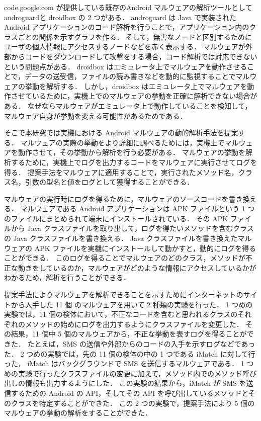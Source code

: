 code.google.com が提供している既存のAndroid マルウェアの解析ツールとして androguard\cite{aguard}と droidbox\cite{dbox} の 2 つがある．
androguard は Java で実装された Android アプリケーションのコード解析を行うことで，アプリケーション内のクラスごとの関係を示すグラフを作る．
そして，無害なノードと区別するためにユーザの個人情報にアクセスするノードなどを赤く表示する．
マルウェアが外部からコードをダウンロードして攻撃をする場合，コード解析では対応できないという問題点がある．
droidbox はエミュレータ上でマルウェアを動作させることで，データの送受信，ファイルの読み書きなどを動的に監視することでマルウェアの挙動を解析する．
しかし，droidbox はエミュレータ上でマルウェアを動作させているために，実機上でのマルウェアの挙動を正確に解析できない場合がある．
なぜならマルウェアがエミュレータ上で動作していることを検知して，マルウェア自身が挙動を変える可能性があるためである．

そこで本研究では実機における Android マルウェアの動的解析手法を提案する．
マルウェアの実際の挙動をより詳細に調べるためには，実機上でマルウェアを動作させて，その挙動から解析を行う必要がある．
マルウェアの挙動を解析するために，実機上でログを出力するコードをマルウェアに実行させてログを得る．
提案手法をマルウェアに適用することで，実行されたメソッド名，クラス名，引数の型名と値をログとして獲得することができる．

マルウェアの実行時にログを得るために，マルウェアのソースコードを書き換える．
マルウェアである Android アプリケーションは APK ファイルという 1 つのファイルにまとめられて端末にインストールされている．
その APK ファイルから Java クラスファイルを取り出して，ログを得たいメソッドを含むクラスの Java クラスファイルを書き換える．
Java クラスファイルを書き換えたマルウェアの APK ファイルを実機にインストールして動かすと，動的にログを得ることができる．
このログを得ることでマルウェアのどのクラス，メソッドが不正な動きをしているのか，マルウェアがどのような情報にアクセスしているかがわかるため，解析を行うことができる．

提案手法によりマルウェアを解析できることを示すためにインターネットのサイト\cite{malwaresite}から入手した 11 個 のマルウェアを用いて 2 種類の実験を行った．
1 つめの実験では，11 個の検体において，不正なコードを含むと思われるクラスのそれぞれのメソッドの始めにログを出力するようにクラスファイルを変更した．
その結果，11 個中 5 個のマルウェアから，不正な挙動を表すログを得ることができた．
たとえば，SMS の送信や外部からのコードの入手を示すログなどであった．
2 つめの実験では，先の 11 個の検体の中の 1 つである iMatch に対して行った，
iMatch はバックグラウンドで SMS を送信するマルウェアである．
1 つめの実験で行ったクラスファイルの変更に加えて，メソッド内でのメソッド呼び出しの情報も出力するようにした．
この実験の結果から，iMatch が SMS を送信するための Android の API，そしてその API を呼び出しているメソッドとそのクラスを特定することができた．
この 2 つの実験で，提案手法により 5 個のマルウェアの挙動の解析をすることができた．

